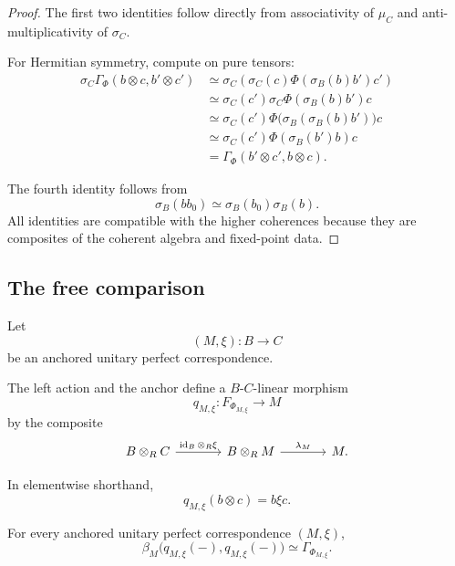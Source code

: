 \begin{proof}
The first two identities follow directly from associativity of \(\mu_C\) and
anti-multiplicativity of \(\sigma_C\).

For Hermitian symmetry, compute on pure tensors:
\[
\begin{aligned}
  \sigma_C
  \Gamma_\Phi
  (b\otimes c,b'\otimes c')
  &\simeq
  \sigma_C
  \left(
    \sigma_C(c)
    \Phi(\sigma_B(b)b')
    c'
  \right)
  \\
  &\simeq
  \sigma_C(c')
  \sigma_C\Phi(\sigma_B(b)b')
  c
  \\
  &\simeq
  \sigma_C(c')
  \Phi\bigl(
    \sigma_B(\sigma_B(b)b')
  \bigr)
  c
  \\
  &\simeq
  \sigma_C(c')
  \Phi(\sigma_B(b')b)
  c
  \\
  &=
  \Gamma_\Phi
  (b'\otimes c',b\otimes c).
\end{aligned}
\]

The fourth identity follows from
\[
  \sigma_B(bb_0)
  \simeq
  \sigma_B(b_0)\sigma_B(b).
\]
All identities are compatible with the higher coherences because they are
composites of the coherent algebra and fixed-point data.
\end{proof}

\subsection{The free comparison}

Let
\[
  (M,\xi):B\to C
\]
be an anchored unitary perfect correspondence.

The left action and the anchor define a \(B\)-\(C\)-linear morphism
\[
  q_{M,\xi}:F_{\Phi_{M,\xi}}\to M
\]
by the composite
\[
\begin{tikzcd}[column sep=large]
  B\otimes_RC
  \arrow[r,
    "{\operatorname{id}_B\otimes_R\xi}"]
  &
  B\otimes_RM
  \arrow[r,"\lambda_M"]
  &
  M.
\end{tikzcd}
\]

In elementwise shorthand,
\[
  q_{M,\xi}(b\otimes c)
  =
  b\xi c.
\]

\begin{proposition}
\label{prop:higher-free-comparison-preserves-gram}
For every anchored unitary perfect correspondence \((M,\xi)\),
\[
  \beta_M
  \bigl(
    q_{M,\xi}(-),
    q_{M,\xi}(-)
  \bigr)
  \simeq
  \Gamma_{\Phi_{M,\xi}}.
\]
\end{proposition}

